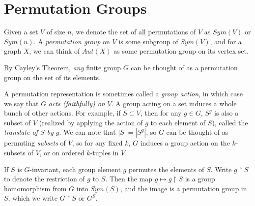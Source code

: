 \renewcommand{\exc}[1]{\subsubsection*{Exercise 2.#1}}

\classheader{}

\section*{Permutation Groups}

Given a set $V$ of size $n$, we denote the set of all permutations of $V$ as $Sym(V)$ or $Sym(n)$.  A \textit{permutation group} on $V$ is some subgroup of $Sym(V)$, and for a graph $X$, we can think of $Aut(X)$ as some permutation group on its vertex set.

By Cayley's Theorem, \textit{any} finite group $G$ can be thought of as a permutation group on the set of its elements.  


A permutation representation is sometimes called a \textit{group action}, in which case we say that $G$ \textit{acts (faithfully) on} $V$.  A group acting on a set induces a whole bunch of other actions.  For example, if $S\subset V$, then for any $g\in G$, $S^g$ is also a subset of $V$ (realized by applying the action of $g$ to each element of $S$), called the \textit{translate of $S$ by $g$}.  We can note that $|S|=|S^g|$, so $G$ can be thought of as permuting \textit{subsets} of $V$, so for any fixed $k$, $G$ induces a group action on the $k$-subsets of $V$, or on ordered $k$-tuples in $V$.


If $S$ is $G$-invariant, each group element $g$ permutes the elements of $S$.  Write $g{\upharpoonright} S$ to denote the restriction of $g$ to $S$.  Then the map $g\mapsto g{\upharpoonright} S$ is a group homomorphism from $G$ into $Sym(S)$, and the image is a permutation group in $S$, which we write $G{\upharpoonright} S$ or $G^S$.

